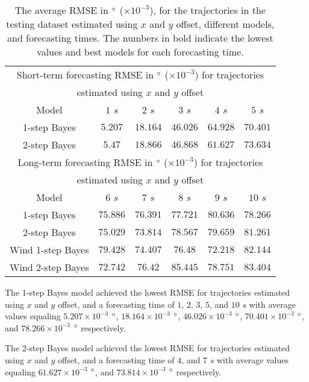 \documentclass[preprint,12pt]{elsarticle}
\begin{document}
\begin{table}[!ht]
	\centering
	\begin{tabular}{|c|c|c|c|c|c|}
		\hline
		\multicolumn{6}{|c|}{Short-term forecasting RMSE in $\degree$ ($\times 10^{-3}$) for trajectories} \\ 
		\multicolumn{6}{|c|}{estimated using $x$ and $y$ offset} \\ \hline
		Model & $1$ $s$ & $2$ $s$ & $3$ $s$ & $4$ $s$ & $5$ $s$ \\ \hline
		1-step Bayes & $\mathbf{5.207}$ & $\mathbf{18.164}$ & $\mathbf{46.026}$ & $64.928$ & $\mathbf{70.401}$ \\ \hline
		2-step Bayes & $5.47$ & $18.866$ & $46.868$ & $\mathbf{61.627}$ & $73.634$ \\ \hline
		\multicolumn{6}{|c|}{Long-term forecasting RMSE in $\degree$ ($\times 10^{-3}$) for trajectories} \\ 
		\multicolumn{6}{|c|}{estimated using $x$ and $y$ offset} \\ \hline
		Model & $6$ $s$ & $7$ $s$ & $8$ $s$ & $9$ $s$ & $10$ $s$ \\ \hline
		1-step Bayes & $75.886$ & $76.391$ & $77.721$ & $80.636$ & $\mathbf{78.266}$ \\ \hline
		2-step Bayes & $75.029$ & $\mathbf{73.814}$ & $78.567$ & $79.659$ & $81.261$ \\ \hline
		Wind 1-step Bayes & $79.428$ & $74.407$ & $\mathbf{76.48}$ & $\mathbf{72.218}$ & $82.144$ \\ \hline
		Wind 2-step Bayes & $\mathbf{72.742}$ & $76.42$ & $85.445$ & $78.751$ & $83.404$ \\ \hline
	\end{tabular}
	\caption{The average RMSE in $\degree$ ($\times 10^{-3}$), for the trajectories in the testing dataset estimated using $x$ and $y$ offset, different models, and forecasting times. The numbers in bold indicate the lowest values and best models for each forecasting time.}
	\label{tab:best_no_abs_RMSE}
\end{table}

The 1-step Bayes model achieved the lowest RMSE for trajectories estimated using $x$ and $y$ offset, and a forecasting time of $1$, $2$, $3$, $5$, and $10$ $s$ with average values equaling $5.207 \times 10^{-3}$ $\degree$, $18.164 \times 10^{-3}$ $\degree$, $46.026 \times 10^{-3}$ $\degree$, $70.401 \times 10^{-3}$ $\degree$, and $78.266 \times 10^{-3}$ $\degree$ respectively.

The 2-step Bayes model achieved the lowest RMSE for trajectories estimated using $x$ and $y$ offset, and a forecasting time of $4$, and $7$ $s$ with average values equaling $61.627 \times 10^{-3}$ $\degree$, and $73.814 \times 10^{-3}$ $\degree$ respectively.
\end{document}

